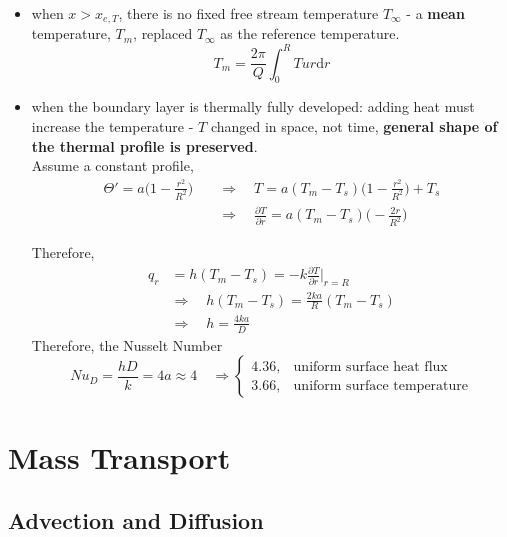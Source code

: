 \documentclass[12pt, a4paper]{article}
\begin{document}
\begin{itemize}
    \item when $x>x_{e,T}$, there is no fixed free stream temperature $T_\infty$ - a \textbf{mean} temperature, $T_m$, replaced $T_\infty$ as the reference temperature.
    \[
        T_m = \frac{2\pi}{Q} \int_{0}^{R} T u r \mathrm{d}r
    \]

    \item when the boundary layer is thermally fully developed: adding heat must increase the temperature - $T$ changed in space, not time, \textbf{general shape of the thermal profile is preserved}. \\ 
    
    Assume a constant profile,
    \begin{align*}
        \Theta' = a \bigg( 1 - \frac{r^2}{R^2} \bigg) \quad 
        & \Rightarrow \quad T = a (T_m - T_s) \bigg( 1 - \frac{r^2}{R^2} \bigg) + T_s \\
        & \Rightarrow \quad \frac{\partial T}{\partial r} = a (T_m - T_s) \bigg(- \frac{2r}{R^2} \bigg)
    \end{align*}
    
    Therefore,
    \begin{align*}
        q_r & =  h(T_m - T_s) = -k \frac{\partial T}{\partial r} \bigg\rvert_{r=R}\\
        & \Rightarrow \quad h(T_m - T_s) = \frac{2ka}{R} (T_m - T_s) \\
        & \Rightarrow \quad h = \frac{4ka}{D}
    \end{align*}
    Therefore, the Nusselt Number
    \[
        Nu_D = \frac{hD}{k} = 4a \approx 4 \quad \Rightarrow 
        \begin{cases}
            4.36, & \text{uniform surface heat flux}\\
            3.66, & \text{uniform surface temperature}
        \end{cases}
    \]
\end{itemize}

\newpage
\section{Mass Transport}
\subsection{Advection and Diffusion}
\end{document}

